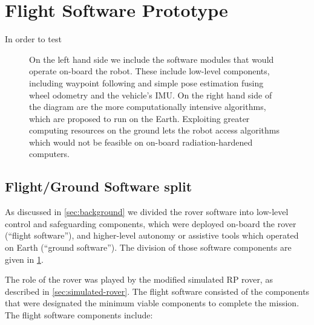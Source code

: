 \documentclass[twocolumn,letterpaper]{IEEEAerospaceCLS}  %
\begin{document}
\section{Flight Software Prototype}

In order to test 

\begin{figure}
\centering
{}
\caption{On the left hand side we include the software modules that would operate on-board the robot.  
These include low-level components, including waypoint following and simple pose estimation fusing wheel odometry and the vehicle's IMU.  
On the right hand side of the diagram are the more computationally intensive algorithms, which are proposed to run on the Earth.  
Exploiting greater computing resources on the ground lets the robot access algorithms which would not be feasible on on-board radiation-hardened computers. \label{fig:rp-software}}
\end{figure}


\subsection{Flight/Ground Software split}

As discussed in \cref{sec:background} we divided the rover software into low-level control and safeguarding components, which were deployed on-board the rover (``flight software''), and higher-level autonomy or assistive tools which operated on Earth (``ground software'').  
The division of those software components are given in \cref{fig:rp-software}.   

The role of the rover was played by the modified simulated RP rover, as described in \cref{sec:simulated-rover}.  The flight software consisted of the components that were designated the minimum viable components to complete the mission.  The flight software components include:
\end{document}
